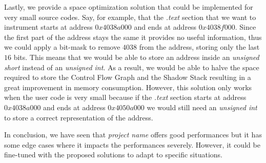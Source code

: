 Lastly, we provide a space optimization solution that could be implemented for very
small source codes. Say, for example, that the \textit{.text} section that we want
to instrument starts at address $0x4038a000$ and ends at address $0x4038f000$.
Since the first part of the address stays the same it provides no useful
information, thus we could apply a bit-mask to remove $4038$ from the address,
storing only the last $16$ bits. This means that we would be able to store an address
inside an \textit{unsigned short} instead of an \textit{unsigned int}. As a
result, we would be able to halve the space required to store the Control Flow Graph
and the Shadow Stack resulting in a great improvement in memory consumption.
However, this solution only works when the user code is very small because if the
\textit{.text} section starts at address $0x4038a000$ and ends at address
$0x4050a000$ we would still need an \textit{unsigned int} to store a correct representation
of the address.

In conclusion, we have seen that \textit{project name} offers good performances but
it has some edge cases where it impacts the performances severely. However, it could
be fine-tuned with the proposed solutions to adapt to specific situations.